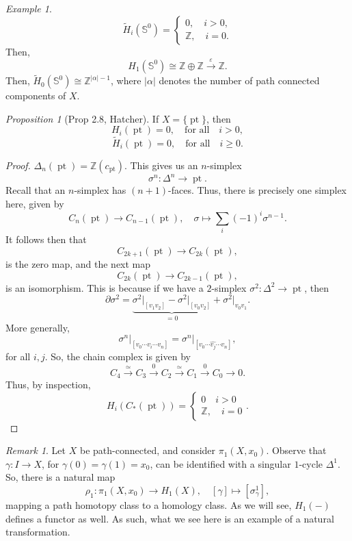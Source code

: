 \documentclass[a4paper]{report}
\theoremstyle{definition}
\theoremstyle{remark}
\newtheorem{remark}{Remark}
\theoremstyle{proposition}
\newtheorem{proposition}{Proposition}
\theoremstyle{conjecture}
\theoremstyle{lemma}
\theoremstyle{corollary}
\theoremstyle{exercise}
\newtheorem{example}{Example}
\newcommand{\on}{\operatorname}
\begin{document}
\begin{example}
    $$\widetilde{H}_i(\mathbb{S}^0) = \begin{cases}
        0, \quad i > 0,\\ 
        \mathbb{Z},\quad i = 0.
    \end{cases}$$
    Then, 
    $$H_1(\mathbb{S}^0) \cong \mathbb{Z} \oplus \mathbb{Z} \stackrel{\varepsilon}{\longrightarrow} \mathbb{Z}.$$
    Then, $\widetilde{H}_0(\mathbb{S}^0) \cong \mathbb{Z}^{\vert \alpha \vert - 1}$,
    where $\vert \alpha\vert$ denotes the number of path connected components of $X$.
\end{example}

\begin{proposition}[Prop 2.8, Hatcher]
    If $X = \lbrace \on{pt}\rbrace$, then 
    $$H_i(\on{pt}) = 0,\quad \text{for all} \quad i > 0,$$
    $$\widetilde{H}_i(\on{pt}) = 0,\quad \text{for all} \quad i \geq 0.$$
\end{proposition}

\begin{proof}
    $\Delta_n(\on{pt}) = \mathbb{Z}(c_{\on{pt}})$.
    This gives us an $n$-simplex 
    $$\sigma^n : \Delta^n \longrightarrow \on{pt}.$$
    Recall that an $n$-simplex has $(n+1)$-faces. Thus, there is precisely one 
    simplex here, given by 
    $$C_n(\on{pt}) \longrightarrow C_{n-1}(\on{pt}),\quad \sigma \longmapsto \sum_i (-1)^i \sigma^{n-1}.$$
    It follows then that 
    $$C_{2k+1}(\on{pt}) \longrightarrow C_{2k}(\on{pt}),$$
    is the zero map, and the next map 
    $$C_{2k}(\on{pt}) \longrightarrow C_{2k-1}(\on{pt}),$$
    is an isomorphism. This is because if we have a $2$-simplex $\sigma^2 : \Delta^2 \to \on{pt}$,
    then 
    $$\partial \sigma^2 = \underbrace{\sigma^2\vert_{[v_1v_2]} - \sigma^2\vert_{[v_0v_2]}}_{=0} + \sigma^2\vert_{v_0v_1}.$$
    More generally, 
    $$\sigma^n\vert_{[v_0 \cdots \widehat{v_i}\cdots v_n]} = \sigma^n\vert_{[v_0 \cdots \widehat{v_j}\cdots v_n]},$$
    for all $i,j$. So, the chain complex is given by 
    $$C_4 \stackrel{\simeq}{\longrightarrow} C_3 \stackrel{0}{\longrightarrow} C_2 \stackrel{\simeq}{\longrightarrow} C_1 \stackrel{0}{\longrightarrow} C_0 \longrightarrow 0.$$
    Thus, by inspection, 
    $$H_i(C_\ast(\on{pt})) = \begin{cases}
        0 \quad i > 0\\ 
        \mathbb{Z},\quad i = 0
    \end{cases}.$$
\end{proof}

\begin{remark}
    Let $X$ be path-connected, and consider $\pi_1(X,x_0)$. 
    Observe that $\gamma : I \to X$, for $\gamma(0) = \gamma(1) = x_0$, can be 
    identified with a singular $1$-cycle $\Delta^1$.
    So, there is a natural map 
    $$\rho_1 : \pi_1(X,x_0) \longrightarrow H_1(X),\quad [\gamma] \longmapsto [\sigma_\gamma^1],$$
    mapping a path homotopy class to a homology class.
    As we will see, $H_1(-)$ defines a functor as well. As such, what we see here is an example 
    of a natural transformation.
\end{remark}
\end{document}
